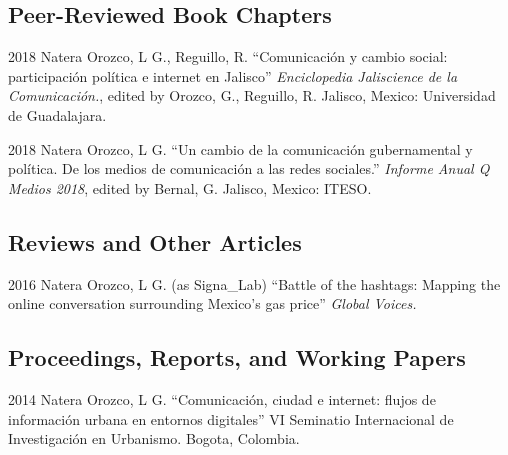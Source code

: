 \documentclass{academiccv}
\begin{document}
\subsection*{Peer-Reviewed Book Chapters}

\begin{tablist}

\item[2018] \tab Natera Orozco, L G., Reguillo, R. \enquote{Comunicación y cambio social: participación política e internet en Jalisco} \textit{Enciclopedia Jaliscience de la Comunicación.}, edited by Orozco, G., Reguillo, R. Jalisco, Mexico: Universidad de Guadalajara.

\item[2018] \tab Natera Orozco, L G. \enquote{Un cambio de la comunicación gubernamental y política. De los medios de comunicación a las redes sociales.} \textit{Informe Anual Q Medios 2018}, edited by Bernal, G. Jalisco, Mexico: ITESO.


\end{tablist}



\subsection*{Reviews and Other Articles}

\begin{tablist}
	
\item[2016] \tab Natera Orozco, L G. (as Signa\_Lab) \enquote{Battle of the hashtags: Mapping the online conversation surrounding Mexico's gas price} \textit{Global Voices.}

	
\end{tablist}



\subsection*{Proceedings, Reports, and Working Papers}

\begin{tablist}

\item[2014] \tab Natera Orozco, L G. \enquote{Comunicación, ciudad e internet: flujos de información urbana en entornos digitales} VI Seminatio Internacional de Investigación en Urbanismo. Bogota, Colombia.
	
\end{tablist}
\end{document}
